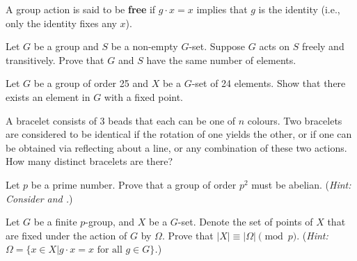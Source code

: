 \begin{problem}
    A group action is said to be \textbf{free} if $g\cdot x = x$ implies that $g$ is the identity (i.e., only the identity fixes any $x$).
    
    Let $G$ be a group and $S$ be a non-empty $G$-set. Suppose $G$ acts on $S$ freely and transitively. Prove that $G$ and $S$ have the same number of elements.
\end{problem}

\begin{problem}
    Let $G$ be a group of order 25 and $X$ be a $G$-set of 24 elements. Show that there exists an element in $G$ with a fixed point.
\end{problem}

\begin{problem}
    A bracelet consists of 3 beads that each can be one of $n$ colours. Two bracelets are considered to be identical if the rotation of one yields the other, or if one can be obtained via reflecting about a line, or any combination of these two actions. How many distinct bracelets are there?
\end{problem}

\begin{problem}\label{problem-group-of-order-prime-squared-is-abelian}
    Let $p$ be a prime number. Prove that a group of order $p^2$ must be abelian.\newline
    (\textit{Hint: Consider  and .})
\end{problem}

\newpage

\begin{problem}
    Let $G$ be a finite $p$-group, and $X$ be a $G$-set. Denote the set of points of $X$ that are fixed under the action of $G$ by $\Omega$. Prove that $|X| \equiv |\Omega| \pmod p$.\newline
    (\textit{Hint: $\Omega = \{x \in X \vert g\cdot x = x \textrm{ for all } g \in G\}$.})
\end{problem}
